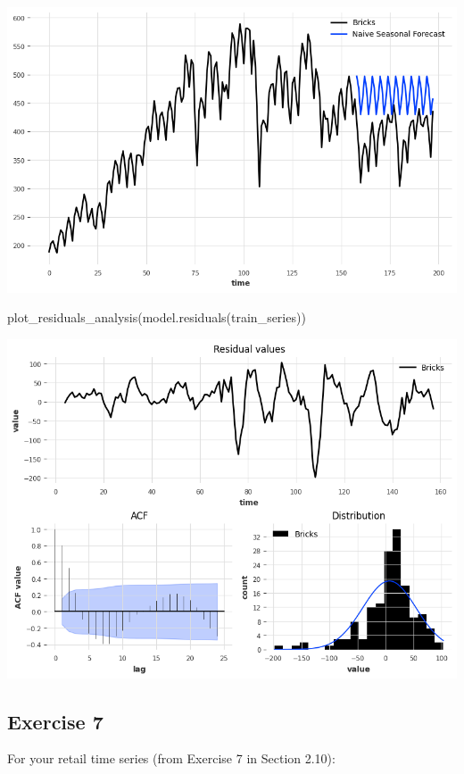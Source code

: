 \documentclass[
  11pt,
]{article}
\newenvironment{Shaded}{\begin{snugshade}}{\end{snugshade}}
\newcommand{\NormalTok}[1]{\textcolor[rgb]{0.00,0.23,0.31}{#1}}
\begin{document}
\includegraphics{hw3_files/figure-pdf/cell-46-output-1.png}

\begin{Shaded}
\begin{Highlighting}[]
\NormalTok{plot\_residuals\_analysis(model.residuals(train\_series))}
\end{Highlighting}
\end{Shaded}

\includegraphics{hw3_files/figure-pdf/cell-47-output-1.png}

\subsection{Exercise 7}\label{exercise-7}

For your retail time series (from Exercise 7 in Section 2.10):
\end{document}
